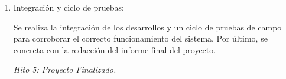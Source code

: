\begin{enumerate}
            \item Integración y ciclo de pruebas:
                \par Se realiza la integración de los desarrollos y un ciclo de pruebas de campo para corroborar el correcto funcionamiento del sistema. Por último, se concreta con la redacción del informe final del proyecto.
                \par \textit{Hito 5: Proyecto Finalizado.}

        \end{enumerate}